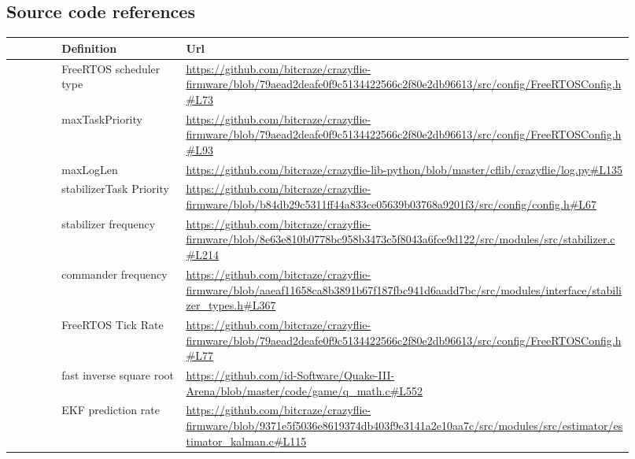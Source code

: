 \documentclass[10pt, a4paper]{article}
\begin{document}
\begin{appendices}
\section{Source code references}
\label{appendix:source-code-references}
    \def\arraystretch{1.5}
    \begin{tabular}{ N p{0.20\linewidth} | p{0.72\linewidth}}
        \hline
         & Definition & Url \\
        \hline
        \label{software-reference:crazyflie-github-scheduler-type} & FreeRTOS scheduler type & \url{https://github.com/bitcraze/crazyflie-firmware/blob/79aead2deafe0f9c5134422566c2f80e2db96613/src/config/FreeRTOSConfig.h#L73} \\
        \label{software-reference:crazyflie-github-maxTaskPriority} & maxTaskPriority & \url{https://github.com/bitcraze/crazyflie-firmware/blob/79aead2deafe0f9c5134422566c2f80e2db96613/src/config/FreeRTOSConfig.h#L93} \\
        \label{software-reference:crazyflie-max-log-len} & maxLogLen & \url{https://github.com/bitcraze/crazyflie-lib-python/blob/master/cflib/crazyflie/log.py#L135} \\
        \label{software-reference:stabilizer-task-priority} & stabilizerTask Priority & \url{https://github.com/bitcraze/crazyflie-firmware/blob/b84db29c5311ff44a833ce05639b03768a9201f3/src/config/config.h#L67} \\
        \label{software-reference:stabilizer-freq} & stabilizer frequency & \url{https://github.com/bitcraze/crazyflie-firmware/blob/8e63e810b0778bc958b3473c5f8043a6fce9d122/src/modules/src/stabilizer.c#L214} \\
        \label{software-reference:commander-freq} & commander frequency & \url{https://github.com/bitcraze/crazyflie-firmware/blob/aaeaf11658ca8b3891b67f187fbc941d6aadd7bc/src/modules/interface/stabilizer_types.h#L367} \\
        \label{software-reference:tick-rate} & FreeRTOS Tick Rate & \url{https://github.com/bitcraze/crazyflie-firmware/blob/79aead2deafe0f9c5134422566c2f80e2db96613/src/config/FreeRTOSConfig.h#L77} \\
        \label{software-reference:invSqrt} & fast inverse square root & \url{https://github.com/id-Software/Quake-III-Arena/blob/master/code/game/q_math.c#L552} \\
        \label{software-reference:EKF-predict-rate} & EKF prediction rate & \url{https://github.com/bitcraze/crazyflie-firmware/blob/9371e5f5036e8619374db403f9e3141a2e10aa7c/src/modules/src/estimator/estimator_kalman.c#L115} \\
        \hline
    \end{tabular}



\end{appendices}
\end{document}
